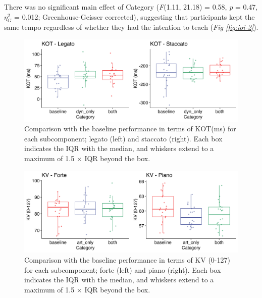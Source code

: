 \documentclass[
  man,floatsintext]{apa6}
\begin{document}
There was no significant main effect of Category (\emph{F}(1.11, 21.18) = 0.58, \emph{p} = 0.47, \(\eta_G^2\) = 0.012; Greenhouse-Geisser corrected), suggesting that participants kept the same tempo regardless of whether they had the intention to teach (\emph{Fig \ref{fig:ioi-2}}).

\begin{figure}
\includegraphics[width=1\linewidth]{manuscript_files/figure-latex/plot-kot-2-1} \caption{\label{fig:kot-2}Comparison with the baseline performance in terms of KOT(ms) for each subcomponent; legato (left) and staccato (right). Each box indicates the IQR with the median, and whiskers extend to a maximum of 1.5 × IQR beyond the box.}\label{fig:plot-kot-2}
\end{figure}

\begin{figure}
\includegraphics[width=1\linewidth]{manuscript_files/figure-latex/plot-vel-2-1} \caption{\label{fig:vel-2}Comparison with the baseline performance in terms of KV (0-127) for each subcomponent; forte (left) and piano (right). Each box indicates the IQR with the median, and whiskers extend to a maximum of 1.5 × IQR beyond the box.}\label{fig:plot-vel-2}
\end{figure}
\end{document}
